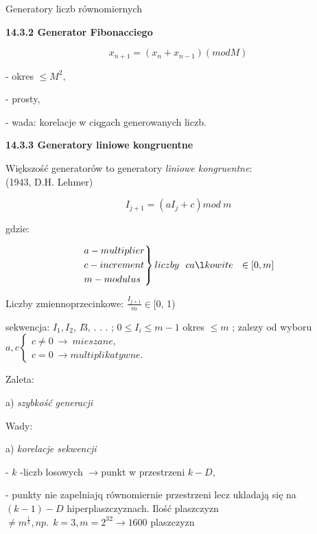     \begin{frame}{Generatory liczb równomiernych}
  	
	\textbf{14.3.2 Generator Fibonacciego}
	\begin{center}
 	$$x_{n+1} = (x_{n} + x_{n-1})(mod M)$$
	\end{center}
	- okres $\leq M^{2},$

	- prosty,

	- wada: korelacje w ciqgach generowanych liczb.
    \newline
	\end{frame}
    \begin{frame}
	\textbf{14.3.3 Generatory liniowe kongruentne}
    
	Większość generatorów to generatory {\it liniowe kongruentne}:\\ (1943, D.H. Lehmer)
	\begin{center}
 	$$I_{j+1} = (aI_{j}+c) mod\ m$$ 
	\end{center}
	gdzie:

    \[
    {\begin{rcases*}
	a - multiplier\\
	c - increment\\
	m - modulus
    \end{rcases*} liczby\ \ całkowite \ \ \in [0,m]}
    \]
	\end{frame}
    \begin{frame}
	Liczby zmiennoprzecinkowe: $\displaystyle \frac{I_{j+1}}{m}\in[0$, 1)
    \newline
    
	sekwencja: $I_{1}, I_{2}$, {\it I}3, . . . ; $0\leq I_{i}\leq m-1$ 
    \newline \newline
    okres $\leq m$ ; zalezy od wyboru $a, c \left\{\begin{array}{l}
	c\neq 0\ \rightarrow\ mieszane,\\
	c=0\ \rightarrow multiplikatywne.
	\end{array}\right.$

	Zaleta:

	a) {\it szybkość generacji}
	\newline
    
	Wady:

	a) {\it korelacje sekwencji}

	- $k$ -liczb losowych $\rightarrow$punkt w przestrzeni $k-D,$

	- punkty nie zapelniajq r\'{o}wnomiernie przestrzeni lecz ukladają się na $(k-1)-D$ 				hiperplaszczyznach. Ilość plaszczyzn $\neq m^{\frac{1}{k}}, np. \ \ k=3, m=2^{32}\rightarrow 1600$ 		plaszczyzn
	
    \end{frame}
